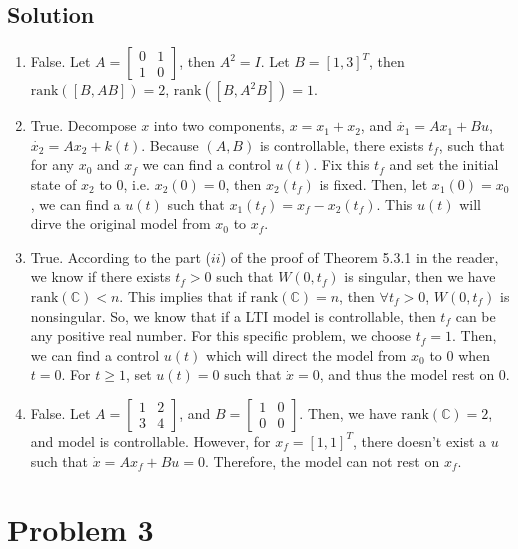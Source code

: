 \documentclass[11pt]{report}
\begin{document}
\subsection*{Solution}
\begin{enumerate}[label=\alph*)]
\item
False. Let $A = \begin{bmatrix} 0&1\\1&0 \end{bmatrix}$, then $A^2 = I$. Let $B=[1,3]^T$, then $\text{rank}([B, AB]) = 2$, $\text{rank}([B, A^2B]) = 1$.
\item
True. Decompose $x$ into two components, $x = x_1 + x_2$, and $\dot{x_1} = A x_1 + B u$, $\dot{x_2} = A x_2 + k(t)$. Because $(A, B)$ is controllable, there exists $t_f$, such that for any $x_0$ and $x_f$ we can find a control $u(t)$. Fix this $t_f$ and set the initial state of $x_2$ to $0$, i.e. $x_2(0) = 0$, then $x_2(t_f)$ is fixed. Then, let $x_1(0) = x_0$, we can find a $u(t)$ such that $x_1(t_f) = x_f - x_2(t_f)$. This $u(t)$ will dirve the original model from $x_0$ to $x_f$.
\item
True. According to the part ($ii$) of the proof of Theorem 5.3.1 in the reader, we know if there exists $t_f>0$ such that $W(0, t_f)$ is singular, then we have $\text{rank}(\mathbb{C})<n$. This implies that if $\text{rank}(\mathbb{C})=n$, then $\forall t_f>0$, $W(0, t_f)$ is nonsingular. So, we know that if a LTI model is controllable, then $t_f$ can be any positive real number. For this specific problem, we choose $t_f=1$. Then, we can find a control $u(t)$ which will direct the model from $x_0$ to $0$ when $t=0$. For $t \geq 1$, set $u(t) = 0$ such that $\dot{x} = 0$, and thus the model rest on $0$.
\item
False. Let $A = \begin{bmatrix}1&2\\3&4\end{bmatrix}$, and $B = \begin{bmatrix}1&0\\0&0\end{bmatrix}$. Then, we have $\text{rank}(\mathbb{C})=2$, and model is controllable. However, for $x_f = [1,1]^T$, there doesn't exist a $u$ such that $\dot{x} = Ax_f+Bu=0$. Therefore, the model can not rest on $x_f$.
\end{enumerate}

\pagebreak
\section*{Problem 3}
\end{document}
